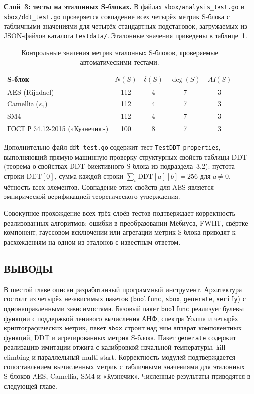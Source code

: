 \textbf{Слой~3: тесты на эталонных S-блоках.} В файлах
\texttt{sbox/analysis\_test.go} и \texttt{sbox/ddt\_test.go}
проверяется совпадение всех четырёх метрик S-блока с табличными
значениями для четырёх стандартных подстановок, загружаемых из
JSON-файлов каталога \texttt{testdata/}. Эталонные значения
приведены в таблице~\ref{tab:reference-expected}.

\begin{table}[h]
\centering
\caption{Контрольные значения метрик эталонных S-блоков, проверяемые автоматическими тестами.}
\label{tab:reference-expected}
\begin{tabular}{lcccc}
\hline
S-блок & $N(S)$ & $\delta(S)$ & $\deg(S)$ & $AI(S)$ \\
\hline
AES (Rijndael)     & 112 & 4 & 7 & 3 \\
Camellia ($s_1$)   & 112 & 4 & 7 & 3 \\
SM4                & 112 & 4 & 7 & 3 \\
ГОСТ Р 34.12-2015 («Кузнечик») & 100 & 8 & 7 & 3 \\
\hline
\end{tabular}
\end{table}

Дополнительно файл \texttt{ddt\_test.go} содержит тест
\texttt{TestDDT\_properties}, выполняющий прямую машинную проверку
структурных свойств таблицы DDT (теорема о свойствах DDT биективного
S-блока из подраздела~3.2): пустота строки $\mathrm{DDT}[0]$,
сумма каждой строки $\sum_b \mathrm{DDT}[a][b] = 256$ для $a \neq 0$,
чётность всех элементов. Совпадение этих свойств для AES является
эмпирической верификацией теоретического утверждения.

Совокупное прохождение всех трёх слоёв тестов подтверждает
корректность реализованных алгоритмов: ошибки в преобразовании
Мёбиуса, FWHT, свёртке компонент, гауссовом исключении или
агрегации метрик S-блока приводят к расхождениям на одном из
эталонов с известным ответом.

\subsection*{ВЫВОДЫ}

В шестой главе описан разработанный программный инструмент.
Архитектура состоит из четырёх независимых пакетов
(\texttt{boolfunc}, \texttt{sbox}, \texttt{generate},
\texttt{verify}) с однонаправленными зависимостями. Базовый
пакет \texttt{boolfunc} реализует булевы функции с поддержкой
ленивого вычисления АНФ, спектра Уолша и четырёх криптографических
метрик; пакет \texttt{sbox} строит над ним аппарат компонентных
функций, DDT и агрегированных метрик S-блока. Пакет
\texttt{generate} содержит реализацию имитации отжига с
калибровкой начальной температуры, hill climbing и параллельный
multi-start. Корректность модулей подтверждается сопоставлением
вычисленных метрик с табличными значениями для эталонных S-блоков
AES, Camellia, SM4 и «Кузнечик». Численные результаты приводятся
в следующей главе.


